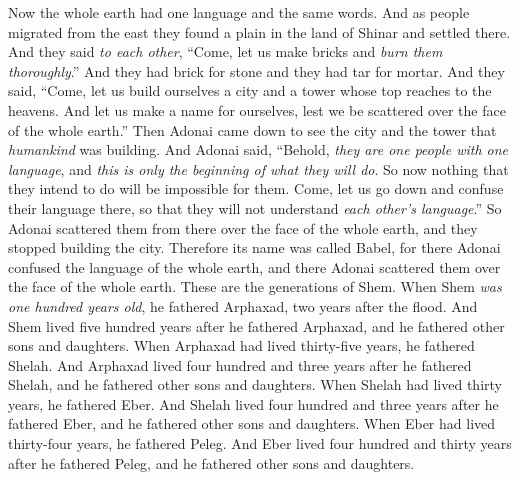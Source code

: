 \begin{biblechapter} %
 Now the whole earth had one language and the same words.
\verse And as people migrated from the east they found a plain in the land of Shinar and settled there.
\verse And they said \textit{to each other}, “Come, let us make bricks and \textit{burn them thoroughly}.” And they had brick for stone and they had tar for mortar.
\verse And they said, “Come, let us build ourselves a city and a tower whose top reaches to the heavens. And let us make a name for ourselves, lest we be scattered over the face of the whole earth.”
\verse Then Adonai came down to see the city and the tower that \textit{humankind} was building.
\verse And Adonai said, “Behold, \textit{they are one people with one language}, and \textit{this is only the beginning of what they will do}. So now nothing that they intend to do will be impossible for them.
\verse Come, let us go down and confuse their language there, so that they will not understand \textit{each other’s language}.”
\verse So Adonai scattered them from there over the face of the whole earth, and they stopped building the city.
\verse Therefore its name was called Babel, for there Adonai confused the language of the whole earth, and there Adonai scattered them over the face of the whole earth.
 These are the generations of Shem. When Shem \textit{was one hundred years old}, he fathered Arphaxad, two years after the flood.
\verse And Shem lived five hundred years after he fathered Arphaxad, and he fathered other sons and daughters.
\verse When Arphaxad had lived thirty-five years, he fathered Shelah.
\verse And Arphaxad lived four hundred and three years after he fathered Shelah, and he fathered other sons and daughters.
\verse When Shelah had lived thirty years, he fathered Eber.
\verse And Shelah lived four hundred and three years after he fathered Eber, and he fathered other sons and daughters.
\verse When Eber had lived thirty-four years, he fathered Peleg.
\verse And Eber lived four hundred and thirty years after he fathered Peleg, and he fathered other sons and daughters.

\end{biblechapter}
